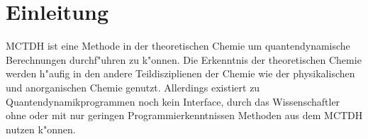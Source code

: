 \chapter{Einleitung}

MCTDH ist eine Methode in der theoretischen Chemie um quantendynamische Berechnungen durchf"uhren zu k"onnen.
Die Erkenntnis der theoretischen Chemie werden h"aufig in den andere Teildisziplienen der Chemie wie der physikalischen und anorganischen Chemie genutzt.
Allerdings existiert zu Quantendynamikprogrammen noch kein Interface, durch das Wissenschaftler ohne oder mit nur geringen Programmierkenntnissen Methoden aus dem MCTDH nutzen k"onnen.      
